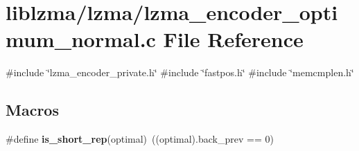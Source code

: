 \section{liblzma/lzma/lzma\+\_\+encoder\+\_\+optimum\+\_\+normal.c File Reference}
\label{lzma__encoder__optimum__normal_8c}
{\ttfamily \#include \char`\"{}lzma\+\_\+encoder\+\_\+private.\+h\char`\"{}}\newline
{\ttfamily \#include \char`\"{}fastpos.\+h\char`\"{}}\newline
{\ttfamily \#include \char`\"{}memcmplen.\+h\char`\"{}}\newline
\subsection*{Macros}
\begin{DoxyCompactItemize}
\item 
\mbox{\label{lzma__encoder__optimum__normal_8c_aad30c576663dea3caa04cc00438c0491}} 
\#define {\bfseries is\+\_\+short\+\_\+rep}(optimal)~((optimal).back\+\_\+prev == 0)
\end{DoxyCompactItemize}
